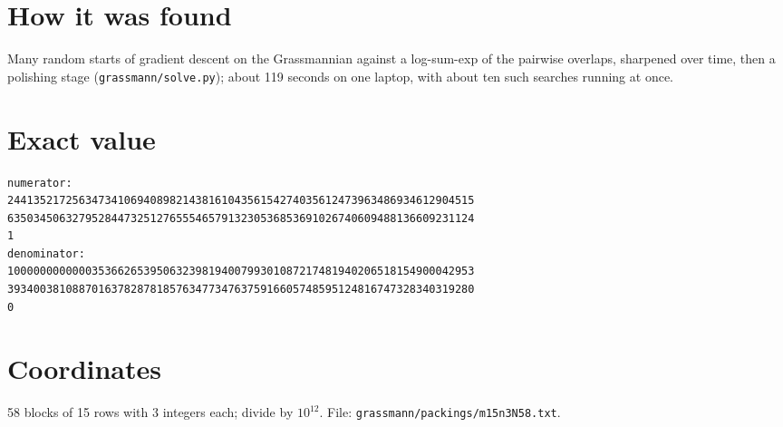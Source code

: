 \documentclass[11pt,a4paper]{article}
\begin{document}
\section{How it was found}
Many random starts of gradient descent on the Grassmannian against a log-sum-exp of the pairwise overlaps, sharpened over time, then a polishing stage (\texttt{grassmann/solve.py}); about 119 seconds on one laptop, with about ten such searches running at once.


\appendix
\section{Exact value}
{\small
\begin{verbatim}
numerator:
244135217256347341069408982143816104356154274035612473963486934612904515
635034506327952844732512765554657913230536853691026740609488136609231124
1
denominator:
100000000000035366265395063239819400799301087217481940206518154900042953
393400381088701637828781857634773476375916605748595124816747328340319280
0
\end{verbatim}}

\section{Coordinates}
58 blocks of 15 rows with 3 integers each; divide by $10^{12}$. File: \texttt{grassmann/packings/m15n3N58.txt}.
{\tiny
\begin{multicols}{3}
\end{multicols}}
\end{document}
